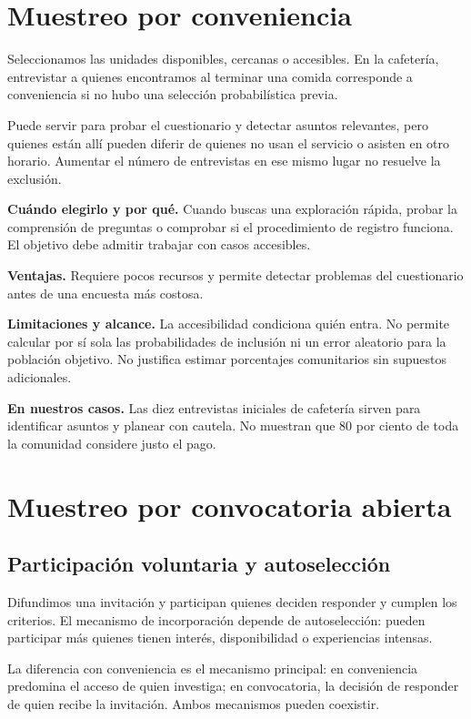 \documentclass[11pt,letterpaper]{article}
\begin{document}
\section{Muestreo por conveniencia}
Seleccionamos las unidades disponibles, cercanas o accesibles. En la cafetería, entrevistar a quienes encontramos al terminar una comida corresponde a conveniencia si no hubo una selección probabilística previa.

Puede servir para probar el cuestionario y detectar asuntos relevantes, pero quienes están allí pueden diferir de quienes no usan el servicio o asisten en otro horario. Aumentar el número de entrevistas en ese mismo lugar no resuelve la exclusión.

\textbf{Cuándo elegirlo y por qué.} Cuando buscas una exploración rápida, probar la comprensión de preguntas o comprobar si el procedimiento de registro funciona. El objetivo debe admitir trabajar con casos accesibles.

\textbf{Ventajas.} Requiere pocos recursos y permite detectar problemas del cuestionario antes de una encuesta más costosa.

\textbf{Limitaciones y alcance.} La accesibilidad condiciona quién entra. No permite calcular por sí sola las probabilidades de inclusión ni un error aleatorio para la población objetivo. No justifica estimar porcentajes comunitarios sin supuestos adicionales.

\textbf{En nuestros casos.} Las diez entrevistas iniciales de cafetería sirven para identificar asuntos y planear con cautela. No muestran que 80 por ciento de toda la comunidad considere justo el pago.
\section{Muestreo por convocatoria abierta}

\subsection{Participación voluntaria y autoselección}
Difundimos una invitación y participan quienes deciden responder y cumplen los criterios. El mecanismo de incorporación depende de autoselección: pueden participar más quienes tienen interés, disponibilidad o experiencias intensas.

La diferencia con conveniencia es el mecanismo principal: en conveniencia predomina el acceso de quien investiga; en convocatoria, la decisión de responder de quien recibe la invitación. Ambos mecanismos pueden coexistir.
\end{document}
